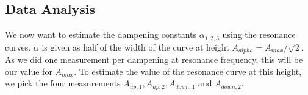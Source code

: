 \subsection{Data Analysis}

We now want to estimate the dampening constants $\alpha_{1, 2, 3}$ using the resonance curves.
$\alpha$ is given as half of the width of the curve at height $A_{alpha} = A_{max}/\sqrt{2}$.
As we did one measurement per dampening at resonance frequency, this will be our value for $A_{max}$.
To estimate the value of the resonance curve at this height, we pick the four measurements $A_{up, 1}, A_{up, 2}, A_{down, 1}$ and $A_{down, 2}$.
